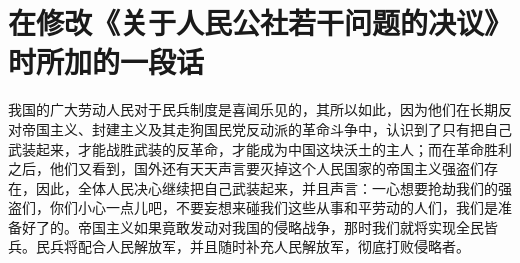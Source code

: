 \section[在修改《关于人民公社若干问题的决议》时所加的一段话（一九五八年十二月）]{在修改《关于人民公社若干问题的决议》时所加的一段话}


我国的广大劳动人民对于民兵制度是喜闻乐见的，其所以如此，因为他们在长期反对帝国主义、封建主义及其走狗国民党反动派的革命斗争中，认识到了只有把自己武装起来，才能战胜武装的反革命，才能成为中国这块沃土的主人；而在革命胜利之后，他们又看到，国外还有天天声言要灭掉这个人民国家的帝国主义强盗们存在，因此，全体人民决心继续把自己武装起来，并且声言：一心想要抢劫我们的强盗们，你们小心一点儿吧，不要妄想来碰我们这些从事和平劳动的人们，我们是准备好了的。帝国主义如果竟敢发动对我国的侵略战争，那时我们就将实现全民皆兵。民兵将配合人民解放军，并且随时补充人民解放军，彻底打败侵略者。


